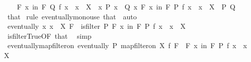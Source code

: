 \begin{isabellebody}
\ \ \isamarkupfalse%
\ {\isachardoublequoteopen}{\isasymforall}\isactrlsub F\ x\ in\ F{\isachardot}{\kern0pt}\ Q\ {\isacharparenleft}{\kern0pt}f\ x{\isacharparenright}{\kern0pt}\ {\isasymand}\ x\ {\isasymin}\ X{\isachardoublequoteclose}\ \ {\isachardoublequoteopen}{\isasymforall}x{\isachardot}{\kern0pt}\ P\ x\ {\isasymlongrightarrow}\ Q\ x{\isachardoublequoteclose}\ {\isachardoublequoteopen}{\isasymforall}\isactrlsub F\ x\ in\ F{\isachardot}{\kern0pt}\ P\ {\isacharparenleft}{\kern0pt}f\ x{\isacharparenright}{\kern0pt}\ {\isasymand}\ x\ {\isasymin}\ X{\isachardoublequoteclose}\ \ P\ Q\isanewline
\ \ \ \ \isamarkupfalse%
\ that{\isacharparenleft}{\kern0pt}{}{\isacharparenright}{\kern0pt}\ \isamarkupfalse%
{\isacharparenleft}{\kern0pt}rule\ eventually{\isacharunderscore}{\kern0pt}mono{\isacharparenright}{\kern0pt}{\isacharparenleft}{\kern0pt}use\ that{\isacharparenleft}{\kern0pt}{}{\isacharparenright}{\kern0pt}\ \ auto{\isacharparenright}{\kern0pt}\isanewline
\ \ \isamarkupfalse%
\ {\isachardoublequoteopen}eventually\ {\isacharparenleft}{\kern0pt}{\isasymlambda}x{\isachardot}{\kern0pt}\ x\ {\isasymin}\ X{\isacharparenright}{\kern0pt}\ F{\isachardoublequoteclose}\ \ {\isachardoublequoteopen}is{\isacharunderscore}{\kern0pt}filter\ {\isacharparenleft}{\kern0pt}{\isasymlambda}P{\isachardot}{\kern0pt}\ {\isasymforall}\isactrlsub F\ x\ in\ F{\isachardot}{\kern0pt}\ P\ {\isacharparenleft}{\kern0pt}f\ x{\isacharparenright}{\kern0pt}\ {\isasymand}\ x\ {\isasymin}\ X{\isacharparenright}{\kern0pt}{\isachardoublequoteclose}\isanewline
\ \ \ \ \isamarkupfalse%
\ is{\isacharunderscore}{\kern0pt}filter{\isachardot}{\kern0pt}True{\isacharbrackleft}{\kern0pt}OF\ that{\isacharbrackright}{\kern0pt}\ \isamarkupfalse%
\ simp\isanewline
{}\isamarkupfalse%
%
\endisatagproof
{\isafoldproof}%
%
\isadelimproof
\isanewline
%
\endisadelimproof
\isanewline
{}\isamarkupfalse%
\ eventually{\isacharunderscore}{\kern0pt}map{\isacharunderscore}{\kern0pt}filter{\isacharunderscore}{\kern0pt}on{\isacharcolon}{\kern0pt}\ {\isachardoublequoteopen}eventually\ P\ {\isacharparenleft}{\kern0pt}map{\isacharunderscore}{\kern0pt}filter{\isacharunderscore}{\kern0pt}on\ X\ f\ F{\isacharparenright}{\kern0pt}\ {\isacharequal}{\kern0pt}\ {\isacharparenleft}{\kern0pt}{\isasymforall}\isactrlsub F\ x\ in\ F{\isachardot}{\kern0pt}\ P\ {\isacharparenleft}{\kern0pt}f\ x{\isacharparenright}{\kern0pt}\ {\isasymand}\ x\ {\isasymin}\ X{\isacharparenright}{\kern0pt}{\isachardoublequoteclose}\isanewline

\end{isabellebody}
